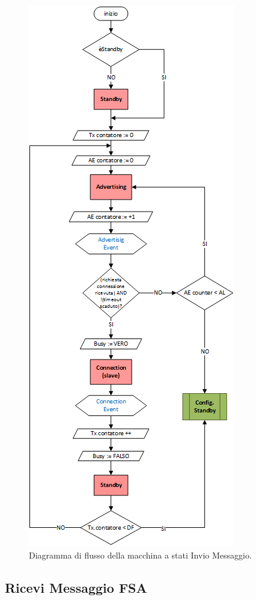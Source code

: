 \begin{figure}[!h]
	\centering
	\includegraphics[height= 0.78\textheight]{Images/diagrammi_fsa/Invio_msg_fsa}
	\caption[Invio Messaggio fsa]{Diagramma di flusso della macchina a stati Invio Messaggio.}
	\label{fig:Invio_msg_fsa}
\end{figure}
\newpage

\subsection{Ricevi Messaggio FSA}
\label{apx:ricevi_fsa}

